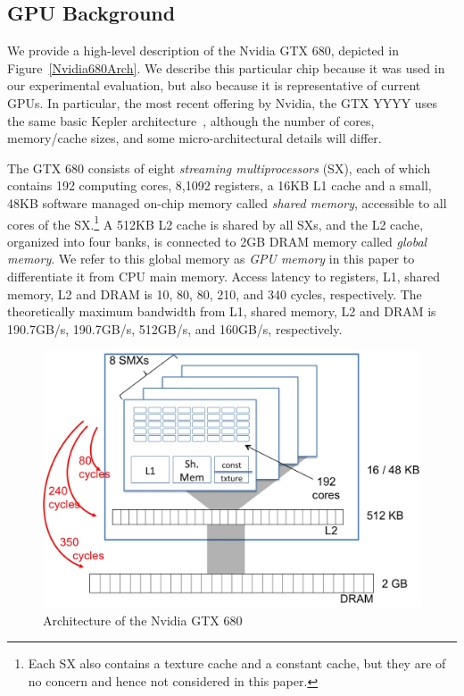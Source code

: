 \subsection{GPU Background}  \label{GPUBackground}
We provide a high-level description of the Nvidia GTX 680, depicted in Figure~\ref{Nvidia680Arch}.
We describe this particular chip because it was used in our experimental evaluation, but also because it is representative of current GPUs.
In particular, the most recent offering by Nvidia, the GTX YYYY uses the same basic Kepler architecture~\cite{????}, although the number of cores, memory/cache sizes, and some micro-architectural details will differ.

The GTX 680 consists of eight \emph{streaming multiprocessors} (SX), 
each of which contains 192 computing cores, 8,1092 registers, a 16KB L1 cache and a small, 48KB software managed on-chip memory called \emph{shared memory}, accessible to all cores of the SX.\footnote{ 
	Each SX also contains a texture cache and a constant cache, 
	but they are of no concern and hence not considered in this paper.}
A 512KB L2 cache is shared by all SXs, and the L2 cache, organized into four banks, is connected to 2GB DRAM memory called \emph{global memory}.
We refer to this global memory as \emph{GPU memory} in this paper 
to differentiate it from CPU main memory.
Access latency to registers, L1, shared memory, L2 and DRAM is 10, 80, 80, 210, and 340 cycles, respectively.
The theoretically maximum bandwidth from L1, shared memory, L2 and DRAM is 190.7GB/s, 190.7GB/s, 512GB/s, and 160GB/s, respectively.


\begin{figure}
\includegraphics[width=\linewidth]{Nvidia680Arch.jpg}
\caption{Architecture of the Nvidia GTX 680}
\label{Nvidia680Arch.jpg}
\end{figure}

